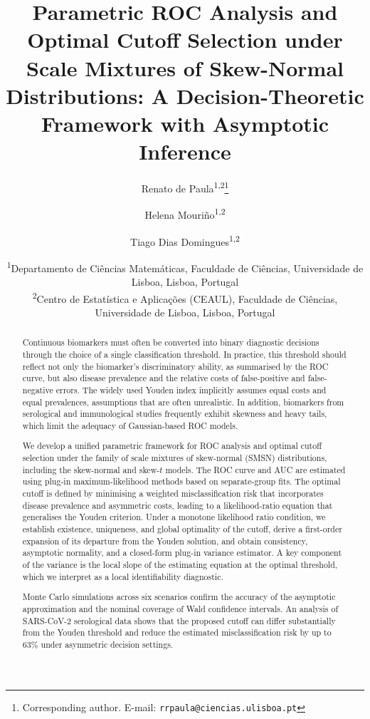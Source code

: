 \documentclass[11pt,a4paper]{article}
\theoremstyle{definition}
\theoremstyle{remark}
\newcommand{\1}{\mathbf{1}}
\begin{document}

\title{\textbf{Parametric ROC Analysis and Optimal Cutoff Selection
       under Scale Mixtures of Skew-Normal Distributions:
       A Decision-Theoretic Framework with Asymptotic Inference}}

\author{
  Renato de Paula\textsuperscript{1,2}\thanks{Corresponding author. E-mail: \texttt{rrpaula@ciencias.ulisboa.pt}}
  \and
  Helena Mouriño\textsuperscript{1,2}
  \and
  Tiago Dias Domingues\textsuperscript{1,2}
}

\date{
  \textsuperscript{1}Departamento de Ciências Matemáticas,
  Faculdade de Ciências, Universidade de Lisboa, Lisboa, Portugal\\
  \textsuperscript{2}Centro de Estatística e Aplicações (CEAUL),
  Faculdade de Ciências, Universidade de Lisboa, Lisboa, Portugal
}

\maketitle

\begin{abstract}
Continuous biomarkers must often be converted into binary diagnostic
decisions through the choice of a single classification threshold.
In practice, this threshold should reflect not only the biomarker's
discriminatory ability, as summarised by the ROC curve, but also disease
prevalence and the relative costs of false-positive and false-negative
errors. The widely used Youden index implicitly assumes equal costs and
equal prevalences, assumptions that are often unrealistic. In addition,
biomarkers from serological and immunological studies frequently exhibit
skewness and heavy tails, which limit the adequacy of Gaussian-based
ROC models.

We develop a unified parametric framework for ROC analysis and optimal
cutoff selection under the family of scale mixtures of skew-normal
(SMSN) distributions, including the skew-normal and skew-$t$ models.
The ROC curve and AUC are estimated using plug-in maximum-likelihood
methods based on separate-group fits. The optimal cutoff is defined by
minimising a weighted misclassification risk that incorporates disease
prevalence and asymmetric costs, leading to a likelihood-ratio equation
that generalises the Youden criterion. Under a monotone likelihood ratio
condition, we establish existence, uniqueness, and global optimality of
the cutoff, derive a first-order expansion of its departure from the
Youden solution, and obtain consistency, asymptotic normality, and a
closed-form plug-in variance estimator. A key component of the variance
is the local slope of the estimating equation at the optimal threshold,
which we interpret as a local identifiability diagnostic.

Monte Carlo simulations across six scenarios confirm the accuracy of
the asymptotic approximation and the nominal coverage of Wald confidence
intervals. An analysis of SARS-CoV-2 serological data shows that the
proposed cutoff can differ substantially from the Youden threshold and
reduce the estimated misclassification risk by up to 63\% under
asymmetric decision settings.
\end{abstract}
\end{document}
